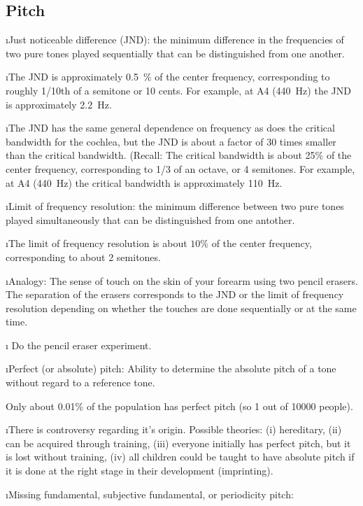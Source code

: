\ei

\subsection{Pitch}
\bi

\i Just noticeable difference (JND):
the minimum difference in the frequencies of 
two pure tones played sequentially that can
be distinguished from one another.

\i The JND is approximately 0.5~\% of the 
center frequency, corresponding to roughly 
1/10th of a semitone or 10 cents.
For example, at A4 (440~Hz) the JND is 
approximately 2.2~Hz.

\i The JND has the same general dependence on 
frequency as does the critical bandwidth 
for the cochlea, but the JND is about a factor 
of 30 times smaller than the critical bandwidth.
(Recall: The critical bandwidth is about 
25\% of the center frequency, corresponding
to 1/3 of an octave, or 4 semitones.
For example, at A4 (440~Hz) the critical bandwidth
is approximately 110~Hz.

\i Limit of frequency resolution:
the minimum difference between two pure tones 
played simultaneously that can be distinguished
from one antother.

\i The limit of frequency resolution is about
$10\%$ of the center frequency, corresponding
to about 2 semitones.

\i Analogy: The sense of touch on the skin of 
your forearm using two pencil erasers.  
The separation of the erasers corresponds to the
JND or the limit of frequency resolution depending
on whether the touches are done sequentially or at 
the same time.

\i \demo 
Do the pencil eraser experiment.

\i Perfect (or absolute) pitch:
Ability to determine the absolute pitch 
of a tone without regard to a reference tone.

Only about 0.01\% of the population has
perfect pitch (so 1 out of 10000 people). 

\i There is controversy regarding it's origin.
Possible theories:
(i) hereditary,
(ii) can be acquired through training, 
(iii) everyone initially has perfect pitch, 
but it is lost without training,
(iv) all children could be taught to have
absolute pitch if it is done at the right
stage in their development (imprinting).

\i Missing fundamental, subjective fundamental, 
or periodicity pitch:

